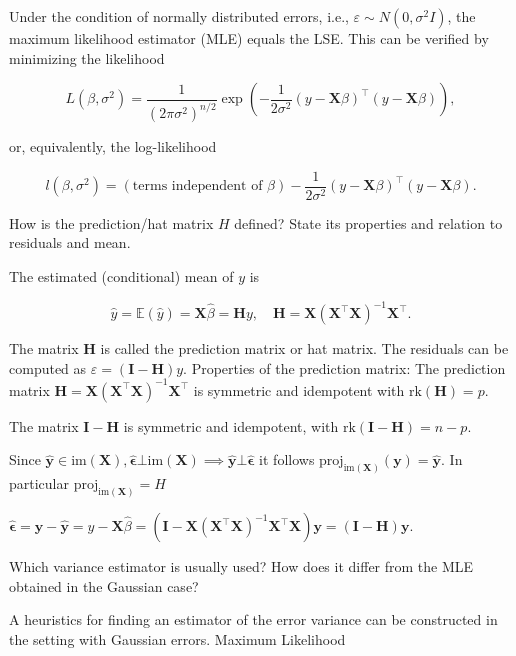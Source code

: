 Under the condition of normally distributed errors, i.e., \(\varepsilon \sim N(0, \sigma^2 I)\), 
the maximum likelihood estimator (MLE) equals the LSE.
This can be verified by minimizing the likelihood

\[
L(\beta, \sigma^2) = \frac{1}{(2\pi\sigma^2)^{n/2}} \exp \left( -\frac{1}{2\sigma^2} (y - \mathbf{X}\beta)^\top (y - \mathbf{X}\beta) \right),
\]

or, equivalently, the log-likelihood

\[
l(\beta, \sigma^2) = (\text{terms independent of } \beta) - \frac{1}{2\sigma^2} (y - \mathbf{X}\beta)^\top (y - \mathbf{X}\beta).
\]


How is the prediction/hat matrix \( H \) defined? State its properties and relation to residuals and mean.


The estimated (conditional) mean of \(y\) is

\[
\hat{y} = \mathbb{E}(\hat{y}) = \mathbf{X} \hat{\beta} = \mathbf{H}y, \quad \mathbf{H} = \mathbf{X} (\mathbf{X}^\top \mathbf{X})^{-1} \mathbf{X}^\top.
\]

The matrix \(\mathbf{H}\) is called the prediction matrix or hat matrix.
The residuals can be computed as \(\hat{\varepsilon} = (\mathbf{I} - \mathbf{H})y\).
Properties of the prediction matrix:
The prediction matrix \(\mathbf{H} = \mathbf{X} (\mathbf{X}^\top \mathbf{X})^{-1} \mathbf{X}^\top\) is symmetric and idempotent with \(\text{rk}(\mathbf{H}) = p\).

The matrix \(\mathbf{I} - \mathbf{H}\) is symmetric and idempotent, with \(\text{rk}(\mathbf{I} - \mathbf{H}) = n - p\).

Since \( \hat{\mathbf{y}} \in \text{im}(\mathbf{X}), \hat{\mathbf{\epsilon}} \bot \text{im}(\mathbf{X}) \implies \hat{\mathbf{y}} \bot \hat{\mathbf{\epsilon}} \)
it follows \( \text{proj}_{\text{im}(\mathbf{X})}(\mathbf{y})= \hat{\mathbf{y}} \). In particular \( \text{proj}_{\text{im}(\mathbf{X})} = H \)

\( \hat{\mathbf{\epsilon}} = \mathbf{y} - \hat{\mathbf{y}} = y - \mathbf{X}\hat{\beta} = (\mathbf{I} - \mathbf{X} (\mathbf{X}^\top \mathbf{X})^{-1} \mathbf{X}^\top\mathbf{X})\mathbf{y} = (\mathbf{I} - \mathbf{H})\mathbf{y} \).


Which variance estimator is usually used? How does it differ from the MLE obtained in the Gaussian case?

A heuristics for finding an estimator of the error variance can be constructed in the setting with Gaussian errors.
Maximum Likelihood

